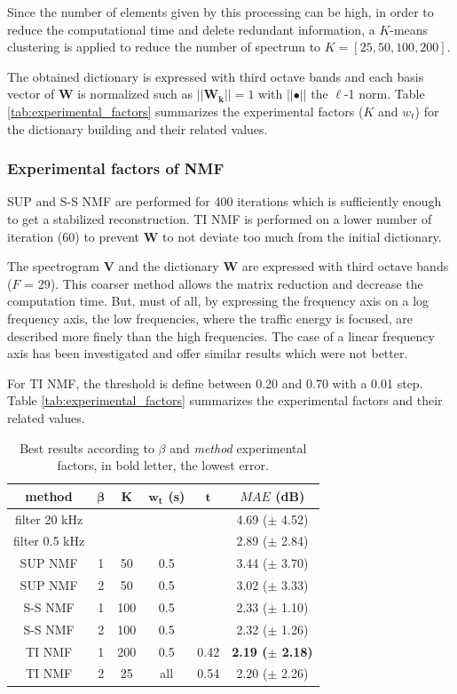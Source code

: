 \documentclass[twocolumn,a4paper,10pt]{article}
\begin{document}
Since the number of elements given by this processing can be high, in order to reduce the computational time and delete redundant information, a $K$-means clustering is applied to reduce the number of spectrum to $K = \left[ 25, 50, 100, 200\right]$.

The obtained dictionary is expressed with third octave bands and each basis vector of $\mathbf{W}$ is normalized such as $\vert \vert \mathbf{W_k} \vert \vert = 1$ with $\vert \vert \bullet \vert\vert$ the $\ell$-1 norm. Table \ref{tab:experimental_factors} summarizes the experimental factors ($K$ and $w_t$) for the dictionary building and their related values.

\subsubsection{Experimental factors of NMF}

SUP and S-S NMF are performed for 400 iterations which is sufficiently enough to get a stabilized reconstruction. TI NMF is performed on a lower number of iteration (60) to prevent $\mathbf{W}$ to not deviate too much from the initial dictionary.

The spectrogram $\mathbf{V}$ and the dictionary $\mathbf{W}$ are expressed with third octave bands ($F$ = 29). This coarser method allows the matrix reduction and decrease the computation time. But,  must of all, by expressing the frequency axis on a log frequency axis,  the low frequencies, where the traffic energy is focused, are described more finely than the high frequencies. The case of a linear frequency axis has been investigated and offer similar results which were not better.

For TI NMF, the threshold is define between 0.20 and 0.70 with a 0.01 step. Table \ref{tab:experimental_factors} summarizes the experimental factors and their related values.

\begin{table}[t]
\centering
\begin{tabular}{@{}cccccc@{}}
\toprule
\textbf{method} & $\mathbf{\beta}$ & $\mathbf{K}$ & $\mathbf{w_t}$ (s) &   $\mathbf{t}$ & \textbf{$MAE$ (dB)} \\ \midrule
filter 20 kHz &  &  &  &  & 4.69 ($\pm$ 4.52) \\
filter 0.5 kHz&  &   &  &  & 2.89 ($\pm$ 2.84) \\ \hline \hline
SUP NMF &  1 & 50 & 0.5  &  & 3.44 ($\pm$ 3.70) \\
SUP NMF &  2 & 50 & 0.5  &   & 3.02 ($\pm$ 3.33) \\ \hline \hline
S-S NMF &  1 & 100 & 0.5 &   & 2.33 ($\pm$ 1.10) \\
S-S NMF &  2 & 100 & 0.5 &   & 2.32 ($\pm$ 1.26) \\ \hline \hline
TI NMF &  1 & 200 & 0.5 &  0.42 &\textbf{2.19 ($\pm$ 2.18)} \\
TI NMF &  2 & 25 & all &  0.54 & 2.20 ($\pm$ 2.26)\\ \bottomrule
\end{tabular}
\caption{Best results according to $\beta$ and \textit{method} experimental factors, in bold letter, the lowest error.}
\label{tab:results}
\end{table}
\end{document}
